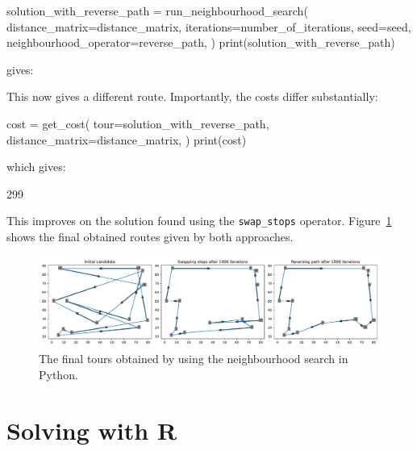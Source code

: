 \begin{pyin}
solution_with_reverse_path = run_neighbourhood_search(
    distance_matrix=distance_matrix,
    iterations=number_of_iterations,
    seed=seed,
    neighbourhood_operator=reverse_path,
)
print(solution_with_reverse_path)
\end{pyin}

gives:

\begin{pyout}
[0, 8, 5, 3, 1, 9, 12, 11, 4, 10, 6, 2, 7, 0]
\end{pyout}

This now gives a different route.
Importantly, the costs differ substantially:

\begin{pyin}
cost = get_cost(
    tour=solution_with_reverse_path,
    distance_matrix=distance_matrix,
)
print(cost)
\end{pyin}

which gives:

\begin{pyout}
299
\end{pyout}

This improves on the solution found using the \texttt{swap_stops}
operator. Figure~\ref{fig:final-tsp-tours-python} shows the final obtained
routes given by both approaches.

\begin{figure}
    \begin{center}
        \includegraphics[width=\textwidth]{./assets/final-tsp-tours-with-python/main.pdf}
    \end{center}
    \caption{The final tours obtained by using the neighbourhood search in
    Python.}
    \label{fig:final-tsp-tours-python}
\end{figure}



\section{Solving with R}\label{sec:solving-with-R}

